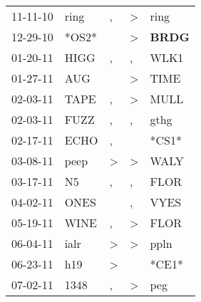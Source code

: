 \begin{supertabular}{p{0.07\textwidth}p{0.06\textwidth}p{0.02\textwidth}p{0.02\textwidth}p{0.06\textwidth}}
          11-11-10\textsuperscript{} &           ring\textsuperscript{} &                , &     \textgreater &           ring\textsuperscript{} \\
          12-29-10\textsuperscript{} &                            *OS2* &                  &     \textgreater &  \textbf{BRDG\textsuperscript{}} \\
          01-20-11\textsuperscript{} &           HIGG\textsuperscript{} &                , &                , &           WLK1\textsuperscript{} \\
          01-27-11\textsuperscript{} &            AUG\textsuperscript{} &                  &     \textgreater &           TIME\textsuperscript{} \\
          02-03-11\textsuperscript{} &           TAPE\textsuperscript{} &                , &     \textgreater &           MULL\textsuperscript{} \\
          02-03-11\textsuperscript{} &           FUZZ\textsuperscript{} &                , &                , &           gthg\textsuperscript{} \\
          02-17-11\textsuperscript{} &           ECHO\textsuperscript{} &                , &                  &                            *CS1* \\
          03-08-11\textsuperscript{} &           peep\textsuperscript{} &     \textgreater &     \textgreater &           WALY\textsuperscript{} \\
          03-17-11\textsuperscript{} &             N5\textsuperscript{} &                , &                , &           FLOR\textsuperscript{} \\
          04-02-11\textsuperscript{} &           ONES\textsuperscript{} &                  &                , &           VYES\textsuperscript{} \\
          05-19-11\textsuperscript{} &           WINE\textsuperscript{} &                , &     \textgreater &           FLOR\textsuperscript{} \\
          06-04-11\textsuperscript{} &           ialr\textsuperscript{} &     \textgreater &     \textgreater &           ppln\textsuperscript{} \\
          06-23-11\textsuperscript{} &            h19\textsuperscript{} &     \textgreater &                  &                            *CE1* \\
          07-02-11\textsuperscript{} &           1348\textsuperscript{} &                , &     \textgreater &            peg\textsuperscript{} \\

\end{supertabular}
